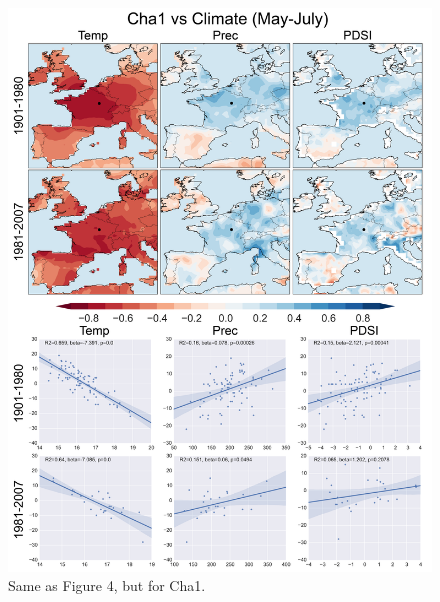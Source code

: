 \documentclass[12pt]{article}
\begin{document}
\begin{figure}
\center
\includegraphics[width=.9\columnwidth,scale=2]{SUPP_fig_07_Cha1_MJJ_climate_onedeg_withtrend.png}
\caption{Same as Figure 4, but for Cha1.}
\end{figure}
\end{document}
